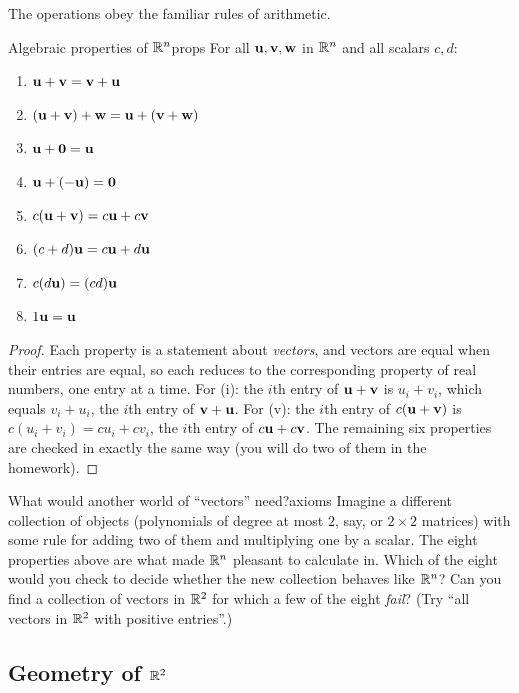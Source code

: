 \documentclass[11pt]{article}
\begin{document}
The operations obey the familiar rules of arithmetic.

\begin{thm}{Algebraic properties of $\mathbb{R}^n$}{props}
For all $\mathbf{u},\mathbf{v},\mathbf{w}$ in $\mathbb{R}^n$ and all scalars $c,d$:
\begin{enumerate}[label=(\roman*),itemsep=1pt]
  \item $\mathbf{u}+\mathbf{v}=\mathbf{v}+\mathbf{u}$
  \item $(\mathbf{u}+\mathbf{v})+\mathbf{w}=\mathbf{u}+(\mathbf{v}+\mathbf{w})$
  \item $\mathbf{u}+\mathbf{0}=\mathbf{u}$
  \item $\mathbf{u}+(-\mathbf{u})=\mathbf{0}$
  \item $c(\mathbf{u}+\mathbf{v})=c\mathbf{u}+c\mathbf{v}$
  \item $(c+d)\mathbf{u}=c\mathbf{u}+d\mathbf{u}$
  \item $c(d\mathbf{u})=(cd)\mathbf{u}$
  \item $1\mathbf{u}=\mathbf{u}$
\end{enumerate}
\end{thm}

\begin{proof}
Each property is a statement about \emph{vectors}, and vectors are equal when their entries are equal, so each
reduces to the corresponding property of real numbers, one entry at a time. For (i): the $i$th entry of
$\mathbf{u}+\mathbf{v}$ is $u_i+v_i$, which equals $v_i+u_i$, the $i$th entry of $\mathbf{v}+\mathbf{u}$. For (v): the $i$th entry of
$c(\mathbf{u}+\mathbf{v})$ is $c(u_i+v_i)=cu_i+cv_i$, the $i$th entry of $c\mathbf{u}+c\mathbf{v}$. The remaining six properties are
checked in exactly the same way (you will do two of them in the homework).
\end{proof}

\begin{think}{What would another world of ``vectors'' need?}{axioms}
Imagine a different collection of objects (polynomials of degree at most $2$, say, or $2\times2$ matrices) with some
rule for adding two of them and multiplying one by a scalar. The eight properties above are what made $\mathbb{R}^n$ pleasant
to calculate in. Which of the eight would you check to decide whether the new collection behaves like $\mathbb{R}^n$?
Can you find a collection of vectors in $\mathbb{R}^2$ for which a few of the eight \emph{fail}? (Try ``all vectors in $\mathbb{R}^2$
with positive entries''.)
\end{think}

\subsection*{Geometry of $\mathbb{R}^2$}
\end{document}

